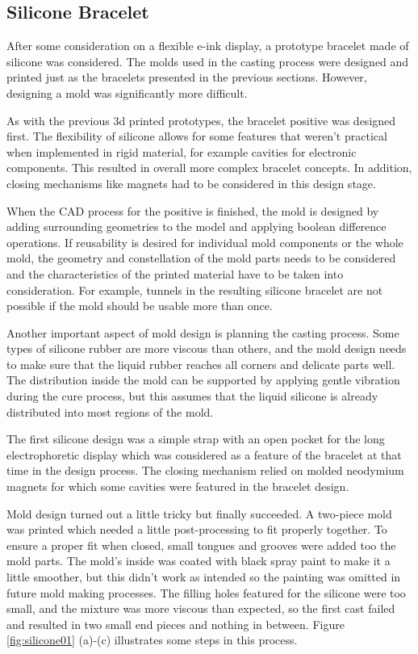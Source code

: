 \subsection{Silicone Bracelet}

After some consideration on a flexible e-ink display, a prototype bracelet made of silicone was considered. The molds used in the casting process were designed and printed just as the bracelets presented in the previous sections. However, designing a mold was significantly more difficult.

As with the previous 3d printed prototypes, the bracelet positive was designed first. The flexibility of silicone allows for some features that weren't practical when implemented in rigid material, for example cavities for electronic components. This resulted in overall more complex bracelet concepts. In addition, closing mechanisms like magnets had to be considered in this design stage.

When the \ac{CAD} process for the positive is finished, the mold is designed by adding surrounding geometries to the model and applying boolean difference operations. If reusability is desired for individual mold components or the whole mold, the geometry and constellation of the mold parts needs to be considered and the characteristics of the printed material have to be taken into consideration. For example, tunnels in the resulting silicone bracelet are not possible if the mold should be usable more than once.

Another important aspect of mold design is planning the casting process. Some types of silicone rubber are more viscous than others, and the mold design needs to make sure that the liquid rubber reaches all corners and delicate parts well. The distribution inside the mold can be supported by applying gentle vibration during the cure process, but this assumes that the liquid silicone is already distributed into most regions of the mold.

The first silicone design was a simple strap with an open pocket for the long electrophoretic display which was considered as a feature of the bracelet at that time in the design process. The closing mechanism relied on molded neodymium magnets for which some cavities were featured in the bracelet design.

Mold design turned out a little tricky but finally succeeded. A two-piece mold was printed which needed a little post-processing to fit properly together. To ensure a proper fit when closed, small tongues and grooves were added too the mold parts. The mold's inside was coated with black spray paint to make it a little smoother, but this didn't work as intended so the painting was omitted in future mold making processes. The filling holes featured for the silicone were too small, and the mixture was more viscous than expected, so the first cast failed and resulted in two small end pieces and nothing in between. Figure \ref{fig:silicone01} (a)-(c) illustrates some steps in this process.

